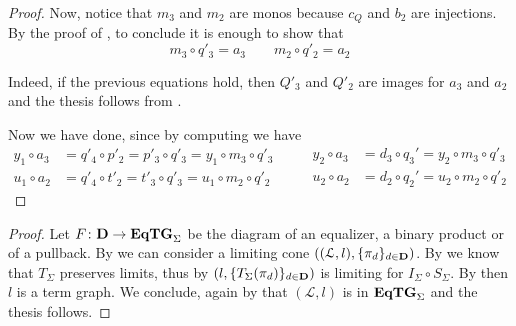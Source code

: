 \documentclass[a4paper,UKenglish,cleveref,pdftex,thm-restate,numberwithinsect]{lipics-v2021}
\def\D{\textbf {\textup{D}}}
\newcommand{\catname}[1]{\textbf{\textup{#1}}}
\newcommand{\EqTG}{\catname{EqTG}}
\begin{document}
\begin{proof}
\smallskip 
\noindent 
\parbox{5.2cm}{\hspace{15pt}Now, notice that  $m_3$ and $m_2$ are monos because $c_Q$ and $b_2$ are injections. By the proof of , to conclude it is enough to show that
	\[m_3\circ q'_3 = a_3 \qquad m_2\circ q'_2=a_2\]
	
		\hspace{15pt}Indeed, if the previous equations hold, then $Q'_3$ and   $Q'_2$ are images for $a_3$ and $a_2$ and the thesis follows from .
	}\hfill \parbox{3.5cm}{
}
	
	
	Now we have done, since by computing we have
\[\begin{split}
	y_1\circ a_3&= q'_4\circ p'_2=p'_3 \circ q'_3=y_1\circ m_3\circ q'_3\\
u_1\circ a_2&= q'_4\circ t'_2=t'_3 \circ q'_3=u_1\circ m_2\circ q'_2 
\end{split} \qquad \begin{split}
 	y_2\circ a_3&= d_3\circ q_3'=y_2\circ m_3\circ q'_3\\
u_2\circ a_2&= d_2\circ q_2'=u_2\circ m_2\circ q'_2
\end{split}\]	
\end{proof} 

\trm*
\begin{proof}\label{proof:term}
	Let $F\colon \D\to \EqTG_{\Sigma}$ be the diagram of an equalizer, a binary product or of a pullback. By  we can consider a limiting cone $((\mathcal{L}, l), \{\pi_d\}_{d\in \D})$. By  we know that $T_\Sigma$ preserves limits, thus by   $(l, \{T_\Sigma(\pi_d)\}_{d\in \D})$ is limiting for $I_\Sigma\circ S_\Sigma$. By  then $l$ is a term graph. We conclude, again by  that $(\mathcal{L}, l)$ is in $\EqTG_{\Sigma}$ and the thesis follows. 
\end{proof}
\end{document}
